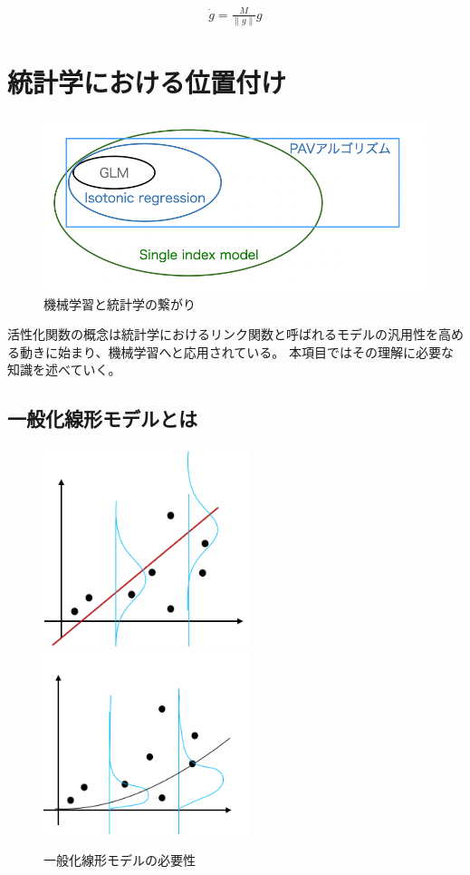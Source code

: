 \begin{eqnarray}
\dot g = \frac{M}{\|g\|} g
\label{eq:hassan}
\end{eqnarray}




\section{統計学における位置付け}

\begin{figure}[hbtp]
        \includegraphics[width=15cm]{asset/machine_statistics.png}
            \caption{機械学習と統計学の繋がり}
            \label{glm}
\end{figure}

活性化関数の概念は統計学におけるリンク関数と呼ばれるモデルの汎用性を高める動きに始まり、機械学習へと応用されている。
本項目ではその理解に必要な知識を述べていく。



\subsection{一般化線形モデルとは}


\begin{figure}[hbtp]
        \includegraphics[width=6cm]{asset/glm1.png}~~~~~ ~~~~~ 
        \includegraphics[width=6cm]{asset/glm2.png}
            \caption{一般化線形モデルの必要性}
            \label{glm}
\end{figure}

